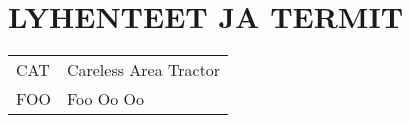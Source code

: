 \chapter*{LYHENTEET JA TERMIT}

\begin{longtable}{ p{4cm} p{10cm} }
CAT & Careless Area Tractor \\
FOO & Foo Oo Oo \\
\end{longtable}
